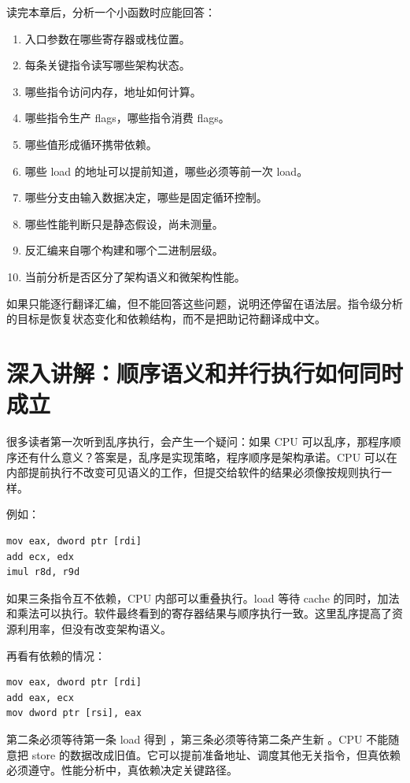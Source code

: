 读完本章后，分析一个小函数时应能回答：

\begin{enumerate}
  \item 入口参数在哪些寄存器或栈位置。
  \item 每条关键指令读写哪些架构状态。
  \item 哪些指令访问内存，地址如何计算。
  \item 哪些指令生产 flags，哪些指令消费 flags。
  \item 哪些值形成循环携带依赖。
  \item 哪些 load 的地址可以提前知道，哪些必须等前一次 load。
  \item 哪些分支由输入数据决定，哪些是固定循环控制。
  \item 哪些性能判断只是静态假设，尚未测量。
  \item 反汇编来自哪个构建和哪个二进制层级。
  \item 当前分析是否区分了架构语义和微架构性能。
\end{enumerate}

如果只能逐行翻译汇编，但不能回答这些问题，说明还停留在语法层。指令级分析的目标是恢复状态变化和依赖结构，而不是把助记符翻译成中文。

\section{深入讲解：顺序语义和并行执行如何同时成立}

很多读者第一次听到乱序执行，会产生一个疑问：如果 CPU 可以乱序，那程序顺序还有什么意义？答案是，乱序是实现策略，程序顺序是架构承诺。CPU 可以在内部提前执行不改变可见语义的工作，但提交给软件的结果必须像按规则执行一样。

例如：

\begin{lstlisting}
mov eax, dword ptr [rdi]
add ecx, edx
imul r8d, r9d
\end{lstlisting}

如果三条指令互不依赖，CPU 内部可以重叠执行。load 等待 cache 的同时，加法和乘法可以执行。软件最终看到的寄存器结果与顺序执行一致。这里乱序提高了资源利用率，但没有改变架构语义。

再看有依赖的情况：

\begin{lstlisting}
mov eax, dword ptr [rdi]
add eax, ecx
mov dword ptr [rsi], eax
\end{lstlisting}

第二条必须等待第一条 load 得到 ，第三条必须等待第二条产生新 。CPU 不能随意把 store 的数据改成旧值。它可以提前准备地址、调度其他无关指令，但真依赖必须遵守。性能分析中，真依赖决定关键路径。

